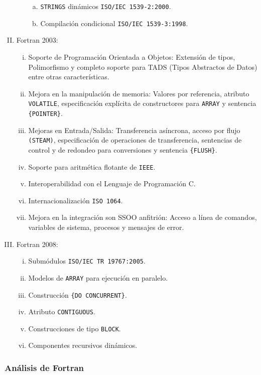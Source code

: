 \begin{enumerate}[I.]
\begin{enumerate}[i.]
\begin{enumerate}[a.]
\item \texttt{STRINGS} dinámicos \texttt{ISO/IEC 1539-2:2000}.
\item Compilación condicional \texttt{ISO/IEC 1539-3:1998}.
\end{enumerate}

\end{enumerate}
\item {}Fortran 2003:
\begin{enumerate}[i.]
\item Soporte de Programación Orientada a Objetos: Extensión de tipos,
Polimorfismo y completo soporte para TADS (Tipos Abstractos de Datos) entre otras
características.
\item Mejora en la manipulación de memoria: Valores por referencia, atributo
\texttt{VOLATILE}, especificación explícita de constructores para \texttt{ARRAY}
y sentencia \texttt{\{POINTER\}}.
\item Mejoras en Entrada/Salida: Transferencia asíncrona, acceso por flujo
\texttt{(STEAM)}, especificación de operaciones de transferencia, sentencias de
control y de redondeo para conversiones y sentencia \texttt{\{FLUSH\}}.
\item Soporte para aritmética flotante de \texttt{IEEE}.
\item Interoperabilidad con el Lenguaje de Programación C.
\item Internacionalización \texttt{ISO 1064}.
\item Mejora en la integración son SSOO anfitrión: Acceso a línea de comandos,
variables de sistema, procesos y mensajes de error.
\end{enumerate}
\item {}Fortran 2008:
\begin{enumerate}[i.]
\item Submódulos \texttt{ISO/IEC TR 19767:2005}.
\item Modelos de \texttt{ARRAY} para ejecución en paralelo.
\item Construcción \texttt{\{DO CONCURRENT\}}.
\item Atributo \texttt{CONTIGUOUS}.
\item Construcciones de tipo \texttt{BLOCK}.
\item Componentes recursivos dinámicos.
\end{enumerate}
\end{enumerate}

\subsubsection{Análisis de Fortran}

